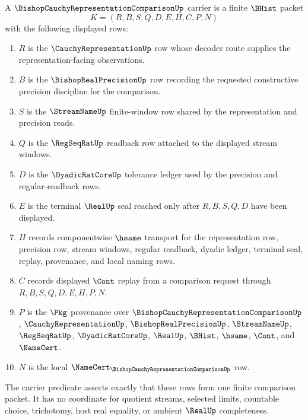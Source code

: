 \begin{definition}
\label{def:bishop-cauchy-representation-comparison-carrier}
A $\BishopCauchyRepresentationComparisonUp$ carrier is a finite $\BHist$ packet
$$
K=(R,B,S,Q,D,E,H,C,P,N)
$$
with the following displayed rows:
\begin{enumerate}
\item $R$ is the $\CauchyRepresentationUp$ row whose decoder route supplies the representation-facing observations.
\item $B$ is the $\BishopRealPrecisionUp$ row recording the requested constructive precision discipline for the comparison.
\item $S$ is the $\StreamNameUp$ finite-window row shared by the representation and precision reads.
\item $Q$ is the $\RegSeqRatUp$ readback row attached to the displayed stream windows.
\item $D$ is the $\DyadicRatCoreUp$ tolerance ledger used by the precision and regular-readback rows.
\item $E$ is the terminal $\RealUp$ seal reached only after $R,B,S,Q,D$ have been displayed.
\item $H$ records componentwise $\hsame$ transport for the representation row, precision row, stream windows, regular readback, dyadic ledger, terminal seal, replay, provenance, and local naming rows.
\item $C$ records displayed $\Cont$ replay from a comparison request through $R,B,S,Q,D,E,H,P,N$.
\item $P$ is the $\Pkg$ provenance over $\BishopCauchyRepresentationComparisonUp$, $\CauchyRepresentationUp$, $\BishopRealPrecisionUp$, $\StreamNameUp$, $\RegSeqRatUp$, $\DyadicRatCoreUp$, $\RealUp$, $\BHist$, $\hsame$, $\Cont$, and $\NameCert$.
\item $N$ is the local $\NameCert_{\BishopCauchyRepresentationComparisonUp}$ row.
\end{enumerate}
The carrier predicate asserts exactly that these rows form one finite comparison packet. It has no coordinate for quotient streams, selected limits, countable choice, trichotomy, host real equality, or ambient $\RealUp$ completeness.
\end{definition}

